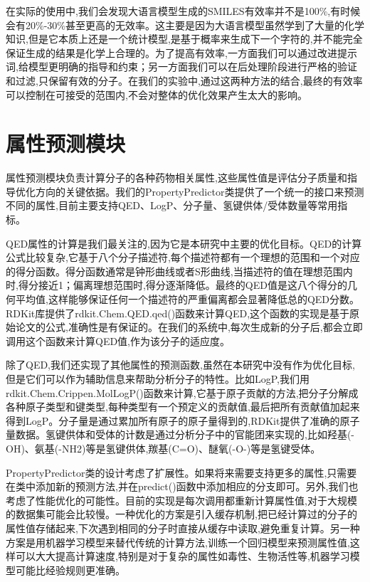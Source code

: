 在实际的使用中,我们会发现大语言模型生成的SMILES有效率并不是100\%,有时候会有20\%-30\%甚至更高的无效率。这主要是因为大语言模型虽然学到了大量的化学知识,但是它本质上还是一个统计模型,是基于概率来生成下一个字符的,并不能完全保证生成的结果是化学上合理的。为了提高有效率,一方面我们可以通过改进提示词,给模型更明确的指导和约束；另一方面我们可以在后处理阶段进行严格的验证和过滤,只保留有效的分子。在我们的实验中,通过这两种方法的结合,最终的有效率可以控制在可接受的范围内,不会对整体的优化效果产生太大的影响。

\section{属性预测模块}

属性预测模块负责计算分子的各种药物相关属性,这些属性值是评估分子质量和指导优化方向的关键依据。我们的PropertyPredictor类提供了一个统一的接口来预测不同的属性,目前主要支持QED、LogP、分子量、氢键供体/受体数量等常用指标。

QED属性的计算是我们最关注的,因为它是本研究中主要的优化目标。QED的计算公式比较复杂,它基于八个分子描述符,每个描述符都有一个理想的范围和一个对应的得分函数。得分函数通常是钟形曲线或者S形曲线,当描述符的值在理想范围内时,得分接近1；偏离理想范围时,得分逐渐降低。最终的QED值是这八个得分的几何平均值,这样能够保证任何一个描述符的严重偏离都会显著降低总的QED分数。RDKit库提供了rdkit.Chem.QED.qed()函数来计算QED,这个函数的实现是基于原始论文的公式,准确性是有保证的。在我们的系统中,每次生成新的分子后,都会立即调用这个函数来计算QED值,作为该分子的适应度。

除了QED,我们还实现了其他属性的预测函数,虽然在本研究中没有作为优化目标,但是它们可以作为辅助信息来帮助分析分子的特性。比如LogP,我们用rdkit.Chem.Crippen.MolLogP()函数来计算,它基于原子贡献的方法,把分子分解成各种原子类型和键类型,每种类型有一个预定义的贡献值,最后把所有贡献值加起来得到LogP。分子量是通过累加所有原子的原子量得到的,RDKit提供了准确的原子量数据。氢键供体和受体的计数是通过分析分子中的官能团来实现的,比如羟基(-OH)、氨基(-NH2)等是氢键供体,羰基(C=O)、醚氧(-O-)等是氢键受体。

PropertyPredictor类的设计考虑了扩展性。如果将来需要支持更多的属性,只需要在类中添加新的预测方法,并在predict()函数中添加相应的分支即可。另外,我们也考虑了性能优化的可能性。目前的实现是每次调用都重新计算属性值,对于大规模的数据集可能会比较慢。一种优化的方案是引入缓存机制,把已经计算过的分子的属性值存储起来,下次遇到相同的分子时直接从缓存中读取,避免重复计算。另一种方案是用机器学习模型来替代传统的计算方法,训练一个回归模型来预测属性值,这样可以大大提高计算速度,特别是对于复杂的属性如毒性、生物活性等,机器学习模型可能比经验规则更准确。

